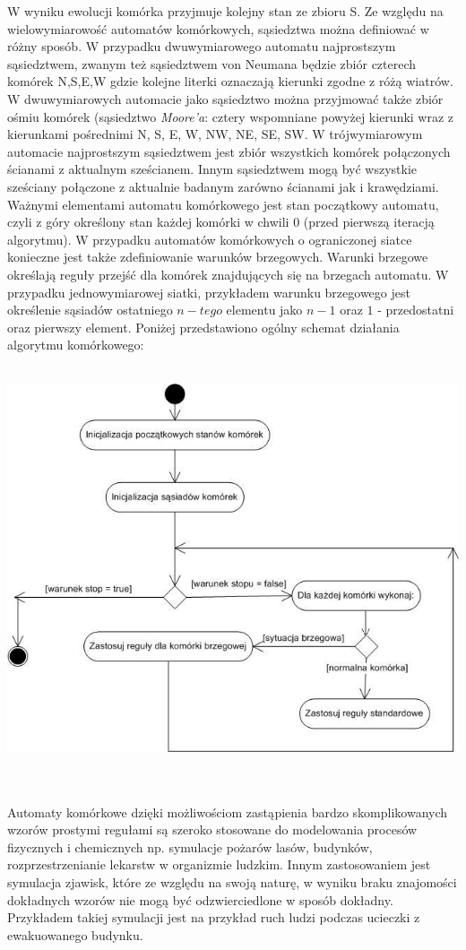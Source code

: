 W wyniku ewolucji komórka przyjmuje kolejny stan ze zbioru S. Ze względu na wielowymiarowość automatów komórkowych, sąsiedztwa można
definiować w różny sposób. W przypadku dwuwymiarowego automatu najprostszym sąsiedztwem, zwanym też sąsiedztwem von Neumana będzie
zbiór czterech komórek {N,S,E,W} gdzie kolejne literki oznaczają kierunki zgodne z różą wiatrów. W dwuwymiarowych automacie jako sąsiedztwo można przyjmować także zbiór ośmiu komórek (sąsiedztwo \textit{Moore'a}: cztery wspomniane powyżej kierunki wraz z kierunkami pośrednimi {N, S, E, W, NW, NE, SE, SW}. W trójwymiarowym automacie najprostszym sąsiedztwem jest zbiór wszystkich 
komórek połączonych ścianami z aktualnym sześcianem. Innym sąsiedztwem mogą być wszystkie sześciany połączone z aktualnie badanym
zarówno ścianami jak i krawędziami. Ważnymi elementami automatu komórkowego jest stan początkowy automatu, czyli z góry określony
stan każdej komórki w chwili 0 (przed pierwszą iteracją algorytmu). W przypadku automatów komórkowych o ograniczonej siatce konieczne
jest także zdefiniowanie warunków brzegowych. Warunki brzegowe określają reguły przejść dla komórek znajdujących się na brzegach
automatu. W przypadku jednowymiarowej siatki, przykładem warunku brzegowego jest określenie sąsiadów ostatniego $n-tego$ elementu jako 
$n-1$ oraz $1$ - przedostatni oraz pierwszy element.
Poniżej przedstawiono ogólny schemat działania algorytmu komórkowego: \\\\
\begin{center}
\includegraphics{algorytm_automatu_kom}
\end{center}
\\\\
Automaty komórkowe dzięki możliwościom zastąpienia bardzo skomplikowanych wzorów prostymi regułami są szeroko stosowane do modelowania
procesów fizycznych i chemicznych np. symulacje pożarów lasów, budynków, rozprzestrzenianie lekarstw w organizmie ludzkim. 
Innym zastosowaniem jest symulacja zjawisk, które ze względu na swoją naturę, w wyniku braku znajomości
dokładnych wzorów nie mogą być odzwierciedlone w sposób dokładny. Przykładem takiej symulacji jest na przykład ruch ludzi podczas ucieczki z ewakuowanego budynku.
